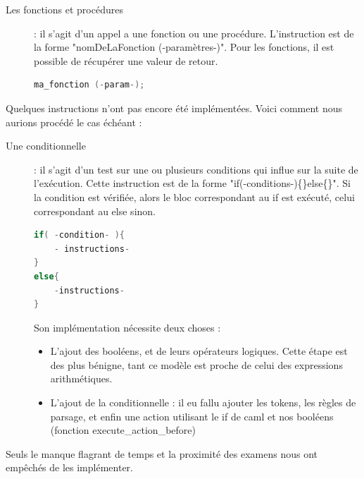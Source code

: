 \documentclass[11pt]{report} %
\begin{document}
\begin{description}

  \item[Les fonctions et procédures]: il s'agit d'un appel a une fonction ou une procédure. L'instruction est de la forme "nomDeLaFonction (-paramètres-)". Pour les fonctions, il est possible de récupérer une valeur de retour.

\begin{minipage}{\linewidth}
\begin{lstlisting}[caption=Fonctions et procédures, language=C]
ma_fonction (-param-);
\end{lstlisting}
\end{minipage}

\end{description}

Quelques instructions n'ont pas encore été implémentées. Voici comment nous aurions procédé le cas échéant : 

\begin{description}
  \item[Une conditionnelle]: il s'agit d'un test sur une ou plusieurs conditions qui influe sur la suite de l'exécution. Cette instruction est de la forme "if(-conditions-)\{\}else\{\}". Si la condition est vérifiée, alors le bloc correspondant au if est exécuté, celui correspondant au else sinon.

\begin{minipage}{\linewidth}
\begin{lstlisting}[caption=Conditionnelle, language=C]
if( -condition- ){
	- instructions-
}
else{
	-instructions-
}
\end{lstlisting}

Son implémentation nécessite deux choses : 
\begin{itemize}
\item L'ajout des booléens, et de leurs opérateurs logiques. Cette étape est des plus bénigne, tant ce modèle est proche de celui des expressions arithmétiques.
\item L'ajout de la conditionnelle : il eu fallu ajouter les tokens, les règles de parsage, et enfin une action utilisant le if de caml et nos booléens (fonction execute\_action\_before)
\end{itemize}


\end{minipage}

\end{description}
Seuls le manque flagrant de temps et la proximité des examens nous ont empêchés de les implémenter.
\end{document}

